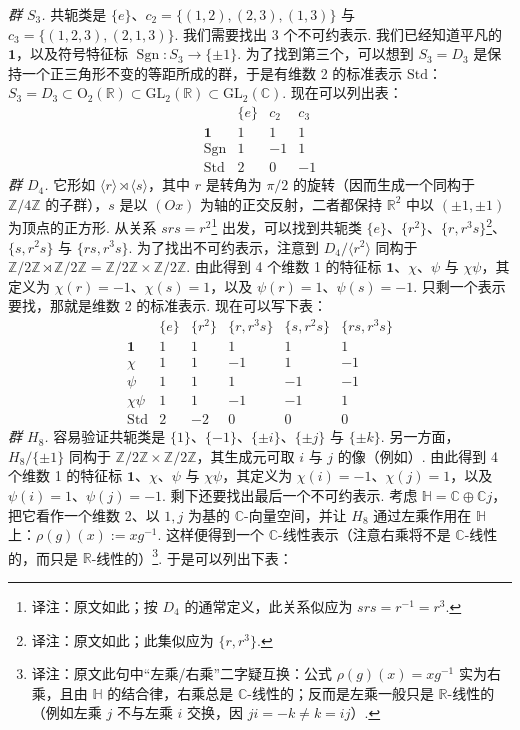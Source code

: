 \begin{numpara}[特征标表]
\emph{群 $S_3$.} 共轭类是 $\{e\}$、$c_2=\{(1,2),(2,3),(1,3)\}$ 与 $c_3=\{(1,2,3),(2,1,3)\}$. 我们需要找出 3 个不可约表示. 我们已经知道平凡的 $\mathbf{1}$，以及符号特征标 $\operatorname{Sgn}:S_3\longrightarrow\{\pm1\}$. 为了找到第三个，可以想到 $S_3=D_3$ 是保持一个正三角形不变的等距所成的群，于是有维数 2 的标准表示 $\mathrm{Std}$：$S_3=D_3\subset\mathrm{O}_2(\mathbb{R})\subset\mathrm{GL}_2(\mathbb{R})\subset\mathrm{GL}_2(\mathbb{C})$. 现在可以列出表：
\[
\begin{array}{c|c|c|c}
 & \{e\} & c_2 & c_3\\\hline
\mathbf{1} & 1 & 1 & 1\\\hline
\operatorname{Sgn} & 1 & -1 & 1\\\hline
\mathrm{Std} & 2 & 0 & -1
\end{array}
\]
\emph{群 $D_4$.} 它形如 $\langle r\rangle\rtimes\langle s\rangle$，其中 $r$ 是转角为 $\pi/2$ 的旋转（因而生成一个同构于 $\mathbb{Z}/4\mathbb{Z}$ 的子群），$s$ 是以 $(Ox)$ 为轴的正交反射，二者都保持 $\mathbb{R}^2$ 中以 $(\pm1,\pm1)$ 为顶点的正方形. 从关系 $srs=r^2$\footnote{译注：原文如此；按 $D_4$ 的通常定义，此关系似应为 $srs=r^{-1}=r^3$.} 出发，可以找到共轭类 $\{e\}$、$\{r^2\}$、$\{r,r^3s\}$\footnote{译注：原文如此；此集似应为 $\{r,r^3\}$.}、$\{s,r^2s\}$ 与 $\{rs,r^3s\}$. 为了找出不可约表示，注意到 $D_4/\langle r^2\rangle$ 同构于 $\mathbb{Z}/2\mathbb{Z}\rtimes\mathbb{Z}/2\mathbb{Z}=\mathbb{Z}/2\mathbb{Z}\times\mathbb{Z}/2\mathbb{Z}$. 由此得到 4 个维数 1 的特征标 $\mathbf{1}$、$\chi$、$\psi$ 与 $\chi\psi$，其定义为 $\chi(r)=-1$、$\chi(s)=1$，以及 $\psi(r)=1$、$\psi(s)=-1$. 只剩一个表示要找，那就是维数 2 的标准表示. 现在可以写下表：
\[
\begin{array}{c|c|c|c|c|c}
 & \{e\} & \{r^2\} & \{r,r^3s\} & \{s,r^2s\} & \{rs,r^3s\}\\\hline
\mathbf{1} & 1 & 1 & 1 & 1 & 1\\\hline
\chi & 1 & 1 & -1 & 1 & -1\\\hline
\psi & 1 & 1 & 1 & -1 & -1\\\hline
\chi\psi & 1 & 1 & -1 & -1 & 1\\\hline
\mathrm{Std} & 2 & -2 & 0 & 0 & 0
\end{array}
\]
\emph{群 $H_8$.} 容易验证共轭类是 $\{1\}$、$\{-1\}$、$\{\pm i\}$、$\{\pm j\}$ 与 $\{\pm k\}$. 另一方面，$H_8/\{\pm1\}$ 同构于 $\mathbb{Z}/2\mathbb{Z}\times\mathbb{Z}/2\mathbb{Z}$，其生成元可取 $i$ 与 $j$ 的像（例如）. 由此得到 4 个维数 1 的特征标 $\mathbf{1}$、$\chi$、$\psi$ 与 $\chi\psi$，其定义为 $\chi(i)=-1$、$\chi(j)=1$，以及 $\psi(i)=1$、$\psi(j)=-1$. 剩下还要找出最后一个不可约表示. 考虑 $\mathbb{H}=\mathbb{C}\oplus\mathbb{C}j$，把它看作一个维数 2、以 $1,j$ 为基的 $\mathbb{C}$-向量空间，并让 $H_8$ 通过左乘作用在 $\mathbb{H}$ 上：$\rho(g)(x):=xg^{-1}$. 这样便得到一个 $\mathbb{C}$-线性表示（注意右乘将不是 $\mathbb{C}$-线性的，而只是 $\mathbb{R}$-线性的）\footnote{译注：原文此句中``左乘/右乘''二字疑互换：公式 $\rho(g)(x)=xg^{-1}$ 实为右乘，且由 $\mathbb{H}$ 的结合律，右乘总是 $\mathbb{C}$-线性的；反而是左乘一般只是 $\mathbb{R}$-线性的（例如左乘 $j$ 不与左乘 $i$ 交换，因 $ji=-k\ne k=ij$）.}. 于是可以列出下表：

\end{numpara}
